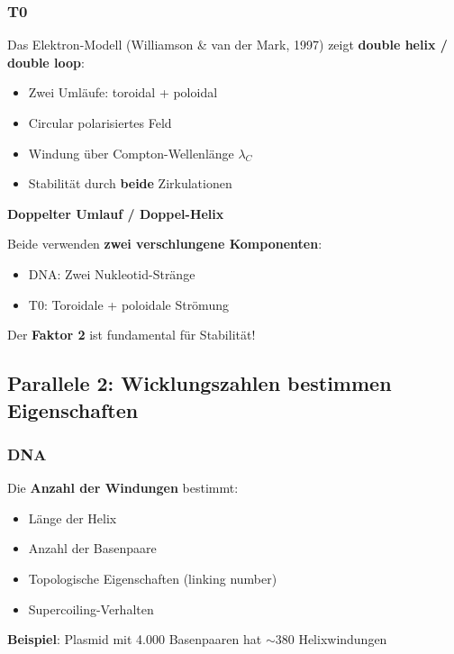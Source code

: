 	\subsubsection{T0}
	
	Das Elektron-Modell (Williamson \& van der Mark, 1997) zeigt \textbf{double helix / double loop}:
	\begin{itemize}
		\item Zwei Umläufe: toroidal + poloidal
		\item Circular polarisiertes Feld
		\item Windung über Compton-Wellenlänge $\lambda_C$
		\item Stabilität durch \textbf{beide} Zirkulationen
	\end{itemize}
	
	\begin{keyresult}
		\textbf{Doppelter Umlauf / Doppel-Helix}
		
		Beide verwenden \textbf{zwei verschlungene Komponenten}:
		\begin{itemize}
			\item DNA: Zwei Nukleotid-Stränge
			\item T0: Toroidale + poloidale Strömung
		\end{itemize}
		
		Der \textbf{Faktor 2} ist fundamental für Stabilität!
	\end{keyresult}
	
	\subsection{Parallele 2: Wicklungszahlen bestimmen Eigenschaften}
	
	\subsubsection{DNA}
	
	Die \textbf{Anzahl der Windungen} bestimmt:
	\begin{itemize}
		\item Länge der Helix
		\item Anzahl der Basenpaare
		\item Topologische Eigenschaften (linking number)
		\item Supercoiling-Verhalten
	\end{itemize}
	
	\textbf{Beispiel}: Plasmid mit 4.000 Basenpaaren hat $\sim$380 Helixwindungen
	
